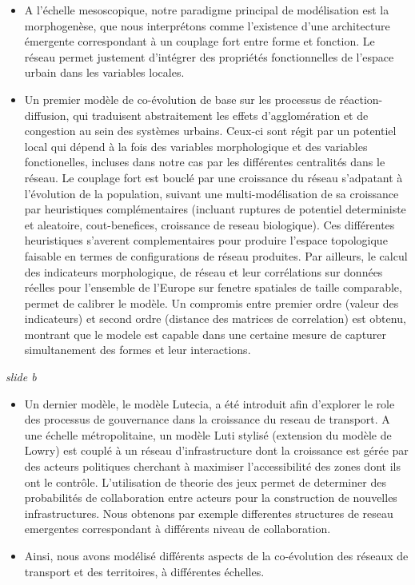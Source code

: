 \documentclass[11pt]{article}
\begin{document}
\begin{itemize}
	\item A l'échelle mesoscopique, notre paradigme principal de modélisation est la morphogenèse, que nous interprétons comme l'existence d'une architecture émergente correspondant à un couplage fort entre forme et fonction. Le réseau permet justement d'intégrer des propriétés fonctionnelles de l'espace urbain dans les variables locales.
	\item Un premier modèle de co-évolution de base sur les processus de réaction-diffusion, qui traduisent abstraitement les effets d'agglomération et de congestion au sein des systèmes urbains. Ceux-ci sont régit par un potentiel local qui dépend à la fois des variables morphologique et des variables fonctionelles, incluses dans notre cas par les différentes centralités dans le réseau. Le couplage fort est bouclé par une croissance du réseau s'adpatant à l'évolution de la population, suivant une multi-modélisation de sa croissance par heuristiques complémentaires (incluant ruptures de potentiel deterministe et aleatoire, cout-benefices, croissance de reseau biologique). Ces différentes heuristiques s'averent complementaires pour produire l'espace topologique faisable en termes de configurations de réseau produites. Par ailleurs, le calcul des indicateurs morphologique, de réseau et leur corrélations sur données réelles pour l'ensemble de l'Europe sur fenetre spatiales de taille comparable, permet de calibrer le modèle. Un compromis entre premier ordre (valeur des indicateurs) et second ordre (distance des matrices de correlation) est obtenu, montrant que le modele est capable dans une certaine mesure de capturer simultanement des formes et leur interactions.
\end{itemize}

\textit{slide b}

\begin{itemize}
	\item Un dernier modèle, le modèle Lutecia, a été introduit afin d'explorer le role des processus de gouvernance dans la croissance du reseau de transport. A une échelle métropolitaine, un modèle Luti stylisé (extension du modèle de Lowry) est couplé à un réseau d'infrastructure dont la croissance est gérée par des acteurs politiques cherchant à maximiser l'accessibilité des zones dont ils ont le contrôle. L'utilisation de theorie des jeux permet de determiner des probabilités de collaboration entre acteurs pour la construction de nouvelles infrastructures. Nous obtenons par exemple differentes structures de reseau emergentes correspondant à différents niveau de collaboration.
	\item Ainsi, nous avons modélisé différents aspects de la co-évolution des réseaux de transport et des territoires, à différentes échelles.
\end{itemize}
\end{document}
